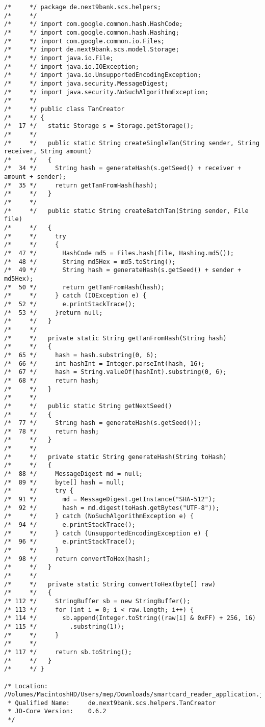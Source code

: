 \begin{lstlisting}
/*     */ package de.next9bank.scs.helpers;
/*     */ 
/*     */ import com.google.common.hash.HashCode;
/*     */ import com.google.common.hash.Hashing;
/*     */ import com.google.common.io.Files;
/*     */ import de.next9bank.scs.model.Storage;
/*     */ import java.io.File;
/*     */ import java.io.IOException;
/*     */ import java.io.UnsupportedEncodingException;
/*     */ import java.security.MessageDigest;
/*     */ import java.security.NoSuchAlgorithmException;
/*     */ 
/*     */ public class TanCreator
/*     */ {
/*  17 */   static Storage s = Storage.getStorage();
/*     */ 
/*     */   public static String createSingleTan(String sender, String receiver, String amount)
/*     */   {
/*  34 */     String hash = generateHash(s.getSeed() + receiver + amount + sender);
/*  35 */     return getTanFromHash(hash);
/*     */   }
/*     */ 
/*     */   public static String createBatchTan(String sender, File file)
/*     */   {
/*     */     try
/*     */     {
/*  47 */       HashCode md5 = Files.hash(file, Hashing.md5());
/*  48 */       String md5Hex = md5.toString();
/*  49 */       String hash = generateHash(s.getSeed() + sender + md5Hex);
/*  50 */       return getTanFromHash(hash);
/*     */     } catch (IOException e) {
/*  52 */       e.printStackTrace();
/*  53 */     }return null;
/*     */   }
/*     */ 
/*     */   private static String getTanFromHash(String hash)
/*     */   {
/*  65 */     hash = hash.substring(0, 6);
/*  66 */     int hashInt = Integer.parseInt(hash, 16);
/*  67 */     hash = String.valueOf(hashInt).substring(0, 6);
/*  68 */     return hash;
/*     */   }
/*     */ 
/*     */   public static String getNextSeed()
/*     */   {
/*  77 */     String hash = generateHash(s.getSeed());
/*  78 */     return hash;
/*     */   }
/*     */ 
/*     */   private static String generateHash(String toHash)
/*     */   {
/*  88 */     MessageDigest md = null;
/*  89 */     byte[] hash = null;
/*     */     try {
/*  91 */       md = MessageDigest.getInstance("SHA-512");
/*  92 */       hash = md.digest(toHash.getBytes("UTF-8"));
/*     */     } catch (NoSuchAlgorithmException e) {
/*  94 */       e.printStackTrace();
/*     */     } catch (UnsupportedEncodingException e) {
/*  96 */       e.printStackTrace();
/*     */     }
/*  98 */     return convertToHex(hash);
/*     */   }
/*     */ 
/*     */   private static String convertToHex(byte[] raw)
/*     */   {
/* 112 */     StringBuffer sb = new StringBuffer();
/* 113 */     for (int i = 0; i < raw.length; i++) {
/* 114 */       sb.append(Integer.toString((raw[i] & 0xFF) + 256, 16)
/* 115 */         .substring(1));
/*     */     }
/*     */ 
/* 117 */     return sb.toString();
/*     */   }
/*     */ }

/* Location:           /Volumes/MacintoshHD/Users/mep/Downloads/smartcard_reader_application.jar
 * Qualified Name:     de.next9bank.scs.helpers.TanCreator
 * JD-Core Version:    0.6.2
 */
\end{lstlisting}

